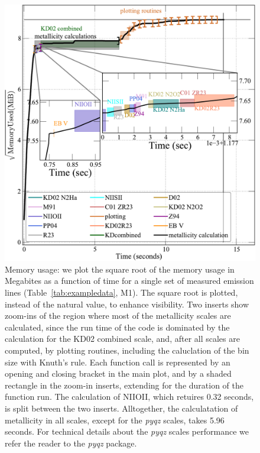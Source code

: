 \documentclass{emulateapj}
\begin{document}
\begin{figure}[ht!]
  \includegraphics[width=1.0\columnwidth]{memusage.pdf}
   \caption{Memory usage: we plot the square root of the memory usage in Megabites as a function of time for a single set of measured emission lines (Table~\ref{tab:exampledata}, M1). The square root is plotted, instead of the natural value, to enhance visibility.  
Two inserts show zoom-ins of the region where most of the metallicity scales are calculated, since the run time of the code is dominated by the calculation for the KD02 combined scale, and, after all scales are computed, by plotting routines, including the caluclation of the bin size with Knuth's rule. 
Each function call is represented by an opening and closing bracket in the main plot, and by a shaded rectangle in the zoom-in inserts, extending for the duration of the function run. 
The calculation of NIIOII, which retuires 0.32 seconds, is split between the two inserts. Alltogether, the calculatation of metallicity in all scales, except for the \emph{pyqz} scales, takes 5.96 seconds. For technical details about the \emph{pyqz} scales performance we refer the reader to the \emph{pyqz} package.}
 \label{fig:mem}
\end{figure}
\end{document}
